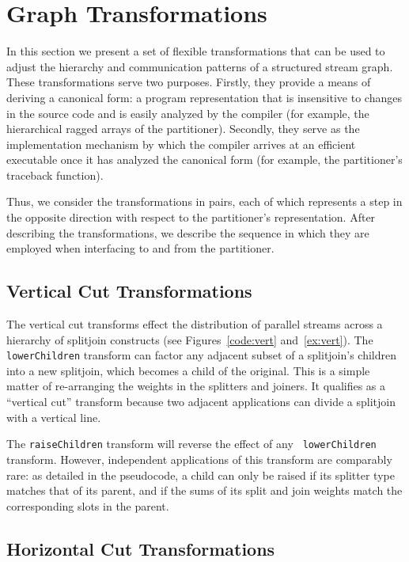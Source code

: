 \section{Graph Transformations}
\label{sec:transforms}

In this section we present a set of flexible transformations that can
be used to adjust the hierarchy and communication patterns of a
structured stream graph.  These transformations serve two purposes.
Firstly, they provide a means of deriving a canonical form: a program
representation that is insensitive to changes in the source code and
is easily analyzed by the compiler (for example, the hierarchical
ragged arrays of the partitioner).  Secondly, they serve as the
implementation mechanism by which the compiler arrives at an efficient
executable once it has analyzed the canonical form (for example, the
partitioner's traceback function).

Thus, we consider the transformations in pairs, each of which
represents a step in the opposite direction with respect to the
partitioner's representation.  After describing the transformations,
we describe the sequence in which they are employed when interfacing
to and from the partitioner.

\subsection{Vertical Cut Transformations}

The vertical cut transforms effect the distribution of parallel
streams across a hierarchy of splitjoin constructs (see
Figures~\ref{code:vert} and~\ref{ex:vert}).  The {\tt lowerChildren}
transform can factor any adjacent subset of a splitjoin's children
into a new splitjoin, which becomes a child of the original.  This is
a simple matter of re-arranging the weights in the splitters and
joiners.  It qualifies as a ``vertical cut'' transform because two
adjacent applications can divide a splitjoin with a vertical line.

The {\tt raiseChildren} transform will reverse the effect of any {\tt
lowerChildren} transform.  However, independent applications of this
transform are comparably rare: as detailed in the pseudocode, a child
can only be raised if its splitter type matches that of its parent,
and if the sums of its split and join weights match the corresponding
slots in the parent.

\subsection{Horizontal Cut Transformations}

